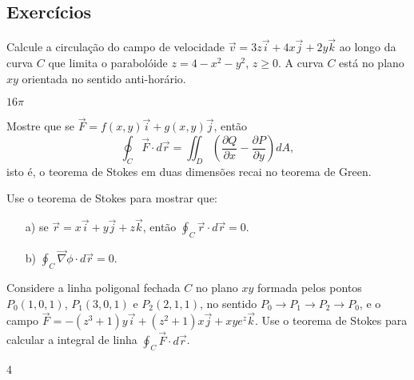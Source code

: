 \subsection*{Exercícios}
\begin{exer}
 Calcule a circulação do campo de velocidade $\vec{v}=3z\vec{i}+4x\vec{j}+2y\vec{k}$ ao longo da curva $C$ que limita o parabolóide $z=4-x^2-y^2$, $z\geq 0$. A curva $C$ está no plano $xy$ orientada no sentido anti-horário.
 \end{exer}
\begin{resp}
 $16\pi$
\end{resp}
\begin{exer}Mostre que se $\vec{F}=f(x,y)\vec{i}+g(x,y)\vec{j}$, então
$$
\oint_C  \vec{F} \cdot d\vec{r}=\iint_{D} \left(\frac{\partial Q}{\partial x} - \frac{\partial P}{\partial
y}\right) dA,
$$
isto é, o teorema de Stokes em duas dimensões recai no teorema de Green.
\end{exer}
\begin{exer}Use o teorema de Stokes para mostrar que:
\begin{itemize}
 \item[a)] se $\vec{r}=x\vec{i}+y\vec{j}+z\vec{k}$, então $\oint_C\vec{r}\cdot d\vec{r}=0$.
 \item[b)] $\oint_C\vec{\nabla}\phi\cdot d\vec{r}=0$. 
\end{itemize}
\end{exer}
\begin{exer} Considere a linha poligonal fechada $C$ no plano $xy$ formada pelos pontos $P_0(1,0,1)$, $P_1(3,0,1)$ e $P_2(2,1,1)$, no sentido $P_0\to P_1\to P_2\to P_0$, e o campo $\vec{F}=-(z^3+1)y\vec{i}+(z^2+1)x\vec{j}+xye^z\vec{k}$. Use o teorema de Stokes para calcular a integral de linha $\oint_C \vec{F}\cdot d\vec{r}$.
\end{exer}
\begin{resp}4
\end{resp}